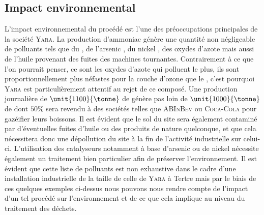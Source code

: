 \subsection{Impact environnemental}
L'impact environnemental du procédé est l'une des préoccupations principales de la société \textsc{Yara}. La production d'ammoniac génère une quantité non négligeable de polluants tels que du , de l'arsenic , du nickel , des oxydes d'azote  mais aussi de l'huile provenant des fuites des machines tournantes. Contrairement à ce que l'on pourrait penser, ce sont les oxydes d'azote qui polluent le plus, ils sont proportionnellement plus néfastes pour la couche d'ozone que le , c'est pourquoi \textsc{Yara} est particulièrement attentif au rejet de ce composé. Une production journalière de $\unit{1100}{\tonne}$ de  génère pas loin de $\unit {1000}{\tonne}$ de  dont $50 \%$ sera revendu à des sociétés telles que \textsc{ABInBev} ou \textsc{Coca-Cola} pour gazéifier leurs boissons. Il est évident que le sol du site sera également contaminé par d'éventuelles fuites d'huile ou des produits de nature quelconque, et que cela nécessitera donc une dépollution du site à la fin de l'activité industrielle sur celui-ci. L'utilisation des catalyseurs notamment à base d'arsenic ou de nickel nécessite également un traitement bien particulier afin de préserver l'environnement. Il est évident que cette liste de polluants est non exhaustive dans le cadre d'une installation industrielle de la taille de celle de \textsc{Yara} à Tertre mais par le biais de ces quelques exemples ci-dessus nous pouvons nous rendre compte de l'impact d'un tel procédé sur l'environnement et de ce que cela implique au niveau du traitement des déchets.
